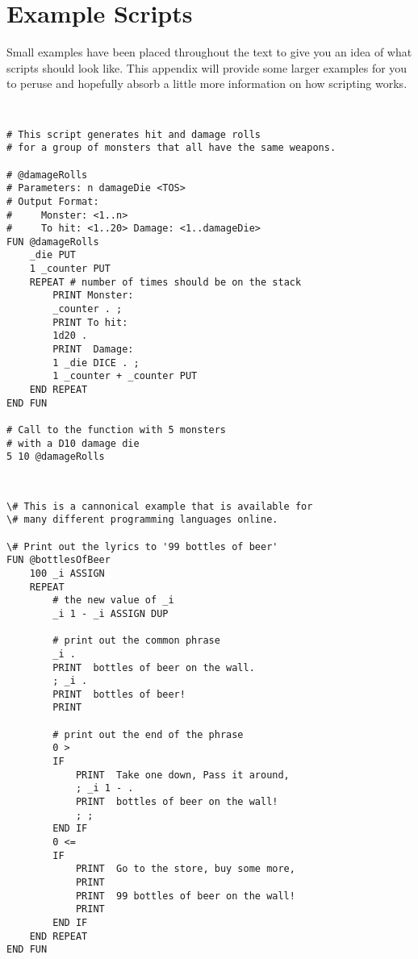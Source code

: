\chapter{Example Scripts}
\label{bigExamples}
Small examples have been placed throughout the text to give you an idea
of what \progLogo scripts should look like. This appendix will provide some
larger examples for you to peruse and hopefully absorb a little more information
on how scripting works.

\breakline

\tt
\begin{verbatim}
# This script generates hit and damage rolls
# for a group of monsters that all have the same weapons.

# @damageRolls
# Parameters: n damageDie <TOS>
# Output Format:
#     Monster: <1..n>
#     To hit: <1..20> Damage: <1..damageDie>
FUN @damageRolls
    _die PUT
    1 _counter PUT
    REPEAT # number of times should be on the stack
        PRINT Monster:
        _counter . ;
        PRINT To hit:
        1d20 .
        PRINT  Damage:
        1 _die DICE . ;
        1 _counter + _counter PUT
    END REPEAT
END FUN

# Call to the function with 5 monsters
# with a D10 damage die
5 10 @damageRolls
\end{verbatim}
\rm

\breakline

\tt
\begin{verbatim}
\# This is a cannonical example that is available for
\# many different programming languages online.

\# Print out the lyrics to '99 bottles of beer' 
FUN @bottlesOfBeer
    100 _i ASSIGN
    REPEAT
        # the new value of _i
        _i 1 - _i ASSIGN DUP
        
        # print out the common phrase
        _i .
        PRINT  bottles of beer on the wall.
        ; _i .
        PRINT  bottles of beer!
        PRINT
        
        # print out the end of the phrase
        0 >
        IF
            PRINT  Take one down, Pass it around,
            ; _i 1 - .
            PRINT  bottles of beer on the wall!
            ; ;
        END IF
        0 <=
        IF
            PRINT  Go to the store, buy some more,
            PRINT
            PRINT  99 bottles of beer on the wall!
            PRINT
        END IF
    END REPEAT
END FUN
\end{verbatim}

\rm

